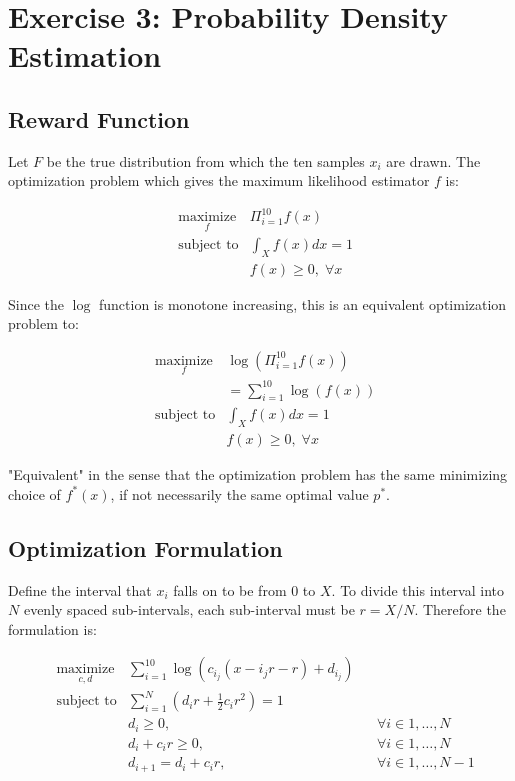 \documentclass[a4paper]{article}
\begin{document}
\section{Exercise 3: Probability Density Estimation}
\subsection{Reward Function}
Let $F$ be the true distribution from which the ten samples $x_i$ are drawn.
The optimization problem which gives the maximum likelihood estimator $f$ is:

\begin{equation*}
\begin{aligned}
& \underset{f}{\text{maximize}}
&  \Pi_{i=1}^{10} f(x) \\
& \text{subject to}
&  \int_X f(x) dx = 1 \\
& & f(x) \geq 0, \; \forall x
\end{aligned}
\end{equation*}

Since the $\log$ function is monotone increasing, this is an equivalent optimization problem to:

\begin{equation*}
\begin{aligned}
& \underset{f}{\text{maximize}}
&  \log \left( \Pi_{i=1}^{10} f(x) \right) \\
& &  = \sum_{i=1}^{10} \log(f(x)) \\
& \text{subject to}
&  \int_X f(x) dx = 1 \\
& & f(x) \geq 0, \; \forall x
\end{aligned}
\end{equation*}

"Equivalent" in the sense that the optimization problem has the same minimizing choice of $f^*(x)$,
if not necessarily the same optimal value $p^*$.

\subsection{Optimization Formulation}
Define the interval that $x_i$ falls on to be from 0 to $X$.
To divide this interval into $N$ evenly spaced sub-intervals, each sub-interval must be $r=X/N$.
Therefore the formulation is:

\begin{equation*}
\begin{aligned}
& \underset{c,d}{\text{maximize}}
& \sum_{i=1}^{10} \log(c_{i_j}(x - i_j r - r) + d_{i_j}) &\\
& \text{subject to}
&  \sum_{i=1}^{N} (d_i r + \frac{1}{2} c_i r^2) = 1 & \\
& & d_i \geq 0,               & & \forall i \in {1,\dots,N} \\
& & d_i + c_i r \geq 0,       & & \forall i \in {1,\dots,N} \\
& & d_{i+1} = d_i + c_i r,    & & \forall i \in {1,\dots,N-1} \\
\end{aligned}
\end{equation*}
\end{document}
